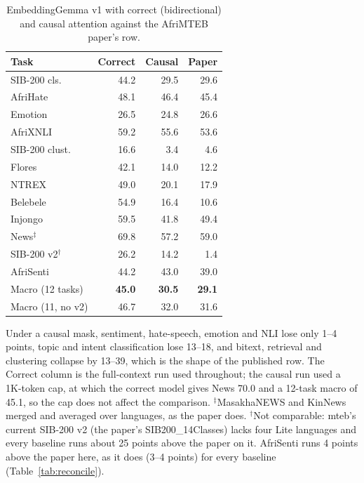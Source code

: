 \documentclass[conference]{IEEEtran}
\begin{document}
\begin{table}[t]
  \centering
  \small
  \setlength{\tabcolsep}{4pt}
  \caption{EmbeddingGemma v1 with correct (bidirectional) and causal attention against the AfriMTEB paper's row.}
  \label{tab:causal}
  \begin{tabular}{lrrr}
    \toprule
    Task & Correct & Causal & Paper \\
    \midrule
    SIB-200 cls.   & 44.2 & 29.5 & 29.6 \\
    AfriHate       & 48.1 & 46.4 & 45.4 \\
    Emotion        & 26.5 & 24.8 & 26.6 \\
    AfriXNLI       & 59.2 & 55.6 & 53.6 \\
    SIB-200 clust. & 16.6 &  3.4 &  4.6 \\
    Flores         & 42.1 & 14.0 & 12.2 \\
    NTREX          & 49.0 & 20.1 & 17.9 \\
    Belebele       & 54.9 & 16.4 & 10.6 \\
    Injongo        & 59.5 & 41.8 & 49.4 \\
    News$^\ddagger$ & 69.8 & 57.2 & 59.0 \\
    SIB-200 v2$^\dagger$ & 26.2 & 14.2 & 1.4 \\
    AfriSenti      & 44.2 & 43.0 & 39.0 \\
    \midrule
    Macro (12 tasks) & \textbf{45.0} & \textbf{30.5} & \textbf{29.1} \\
    Macro (11, no v2) & 46.7 & 32.0 & 31.6 \\
    \bottomrule
  \end{tabular}
  
\end{table}

Under a causal mask, sentiment, hate-speech, emotion and NLI lose only 1--4 points, topic and intent classification lose 13--18, and bitext, retrieval and clustering collapse by 13--39, which is the shape of the published row. The Correct column is the full-context run used throughout; the causal run used a 1K-token cap, at which the correct model gives News 70.0 and a 12-task macro of 45.1, so the cap does not affect the comparison. $^\ddagger$MasakhaNEWS and KinNews merged and averaged over
languages, as the paper does. $^\dagger$Not comparable: mteb's current
SIB-200 v2 (the paper's SIB200\_14Classes) lacks four Lite languages and every baseline runs about 25 points above the paper on it. AfriSenti runs 4 points above the paper here, as it does (3--4 points) for every baseline (Table~\ref{tab:reconcile}).
\end{document}

